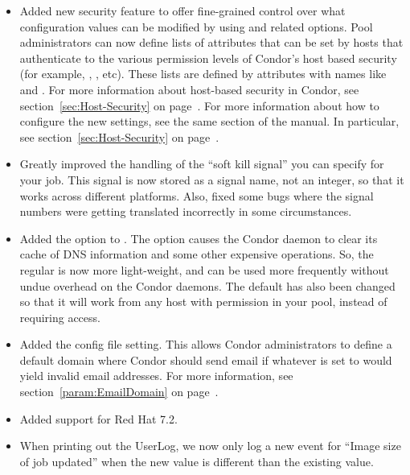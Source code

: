 \begin{itemize}
\item Added new security feature to offer fine-grained control over
what configuration values can be modified by 
using  and related options.
Pool administrators can now define lists of attributes that can be set
by hosts that authenticate to the various permission levels of
Condor's host based security (for example, ,
, etc).
These lists are defined by attributes with names like
 and
. 
For more information about host-based security in Condor, see
section~\ref{sec:Host-Security} on page~\pageref{sec:Host-Security}.
For more information about how to configure the new settings, see the
same section of the manual.
In particular, see section~\ref{sec:Host-Security} on
page~\pageref{sec:Host-Security}. 

\item Greatly improved the handling of the ``soft kill signal'' you
can specify for your job.
This signal is now stored as a signal name, not an integer, so that it
works across different platforms.
Also, fixed some bugs where the signal numbers were getting translated
incorrectly in some circumstances.

\item Added the  option to .
The  option causes the Condor daemon to clear its cache of
DNS information and some other expensive operations.
So, the regular  is now more light-weight, and can
be used more frequently without undue overhead on the Condor daemons. 
The default  has also been changed so that it will
work from any host with  permission in your pool,
instead of requiring  access.

\item Added the  config file setting.
This allows Condor administrators to define a default domain where
Condor should send email if whatever  is set to
would yield invalid email addresses.
For more information, see section~\ref{param:EmailDomain} on
page~\pageref{param:EmailDomain}.

\item
Added support for Red Hat 7.2.

\item When printing out the UserLog, we now only log a new event for
``Image size of job updated'' when the new value is different than the
existing value.

\end{itemize}

